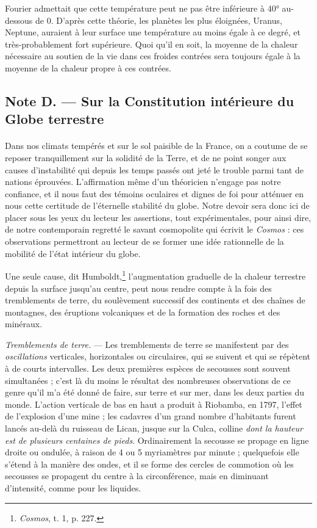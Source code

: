 \documentclass[a4paper, 11pt, oneside, landscape]{article}
\begin{document}
Fourier admettait que cette température peut ne pas être inférieure à 40° au-dessous de 0. D'après cette théorie, les planètes les plus éloignées, Uranus, Neptune, auraient à leur surface une température au moins égale à ce degré, et très-probablement fort supérieure. Quoi qu'il en soit, la moyenne de la chaleur nécessaire au soutien de la vie dans ces froides contrées sera toujours égale à la moyenne de la chaleur propre à ces contrées.
\clearpage
\subsection{Note D. --- Sur la Constitution intérieure du Globe terrestre}
\paragraph{}
Dans nos climats tempérés et sur le sol paisible de la France, on a coutume de se reposer tranquillement sur la solidité de la Terre, et de ne point songer aux causes d'instabilité qui depuis les temps passés ont jeté le trouble parmi tant de nations éprouvées. L'affirmation même d'un théoricien n'engage pas notre confiance, et il nous faut des témoins oculaires et dignes de foi pour atténuer en nous cette certitude de l'éternelle stabilité du globe. Notre devoir sera donc ici de placer sous les yeux du lecteur les assertions, tout expérimentales, pour ainsi dire, de notre contemporain regretté le savant cosmopolite qui écrivit le \emph{Cosmos} : ces observations permettront au lecteur de se former une idée rationnelle de la mobilité de l'état intérieur du globe.

Une seule cause, dit Humboldt,\footnote{\emph{Cosmos}, t. 1, p. 227.} l'augmentation graduelle de la chaleur terrestre depuis la surface jusqu'au centre, peut nous rendre compte à la fois des tremblements de terre, du soulèvement successif des continents et des chaînes de montagnes, des éruptions volcaniques et de la formation des roches et des minéraux.

\emph{Tremblements de terre.} --- Les tremblements de terre se manifestent par des \emph{oscillations} verticales, horizontales ou circulaires, qui se suivent et qui se répètent à de courts intervalles. Les deux premières espèces de secousses sont souvent simultanées ; c'est là du moins le résultat des nombreuses observations de ce genre qu'il m'a été donné de faire, sur terre et sur mer, dans les deux parties du monde. L'action verticale de bas en haut a produit à Riobamba, en 1797, l'effet de l'explosion d'une mine ; les cadavres d'un grand nombre d'habitants furent lancés au-delà du ruisseau de Lican, jusque sur la Culca, colline \emph{dont la hauteur est de plusieurs centaines de pieds}. Ordinairement la secousse se propage en ligne droite ou ondulée, à raison de 4 ou 5 myriamètres par minute ; quelquefois elle s'étend à la manière des ondes, et il se forme des cercles de commotion où les secousses se propagent du centre à la circonférence, mais en diminuant d'intensité, comme pour les liquides.
\end{document}
